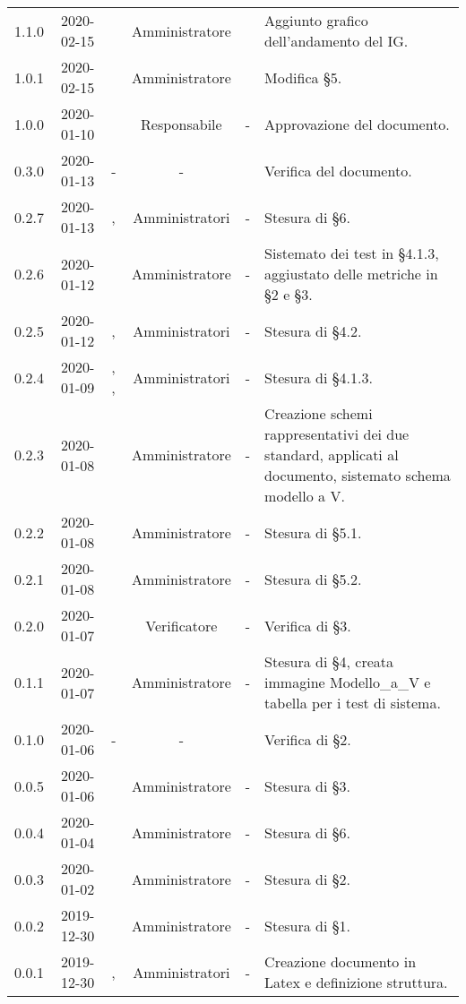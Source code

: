 {\begin{longtable}{ c c  C{2.5cm} c c C{3.5cm}}
1.1.0 & 2020-02-15 & \PF{} & Amministratore & \SE{} & Aggiunto grafico dell'andamento del IG. \\
1.0.1 & 2020-02-15 & \PF{} & Amministratore & \AT{} & Modifica §5. \\
1.0.0 & 2020-01-10 & \SE{} & Responsabile & - & Approvazione del documento. \\
0.3.0 & 2020-01-13 & - & - & \LD{} & Verifica del documento. \\
0.2.7 & 2020-01-13 & \MC{}, \AT{} & Amministratori & - & Stesura di §6. \\
0.2.6 & 2020-01-12 & \AT{} & Amministratore & - & Sistemato dei test in §4.1.3, aggiustato delle metriche in §2 e §3. \\
0.2.5 & 2020-01-12 & \MC{}, \BR{} & Amministratori & - & Stesura di §4.2. \\
0.2.4 & 2020-01-09 & \MC{}, \AT{}, \BR{} & Amministratori & - & Stesura di §4.1.3. \\
0.2.3 & 2020-01-08 & \AT{} & Amministratore & - & Creazione schemi rappresentativi dei due standard, applicati al documento, sistemato schema modello a V. \\
0.2.2 & 2020-01-08 & \MC{} & Amministratore & - & Stesura di §5.1. \\
0.2.1 & 2020-01-08 & \AT{} & Amministratore & - & Stesura di §5.2. \\
0.2.0 & 2020-01-07 & \DF{} & Verificatore & - & Verifica di §3. \\
0.1.1 & 2020-01-07 & \AT{} & Amministratore & - & Stesura di §4, creata immagine Modello\_a\_V e tabella per i test di sistema. \\
0.1.0 & 2020-01-06 & - & - & \LD{} & Verifica di §2. \\
0.0.5 & 2020-01-06 & \BR{} & Amministratore & - & Stesura di §3. \\
0.0.4 & 2020-01-04 & \MC{} & Amministratore & - & Stesura di §6. \\
0.0.3 & 2020-01-02 & \MC{} & Amministratore & - & Stesura di §2. \\
0.0.2 & 2019-12-30 & \AT{} & Amministratore & - & Stesura di §1. \\
0.0.1 & 2019-12-30 & \AT{}, \MC{} & Amministratori & - & Creazione documento in Latex e definizione struttura. \\	
		
\end{longtable}
}
